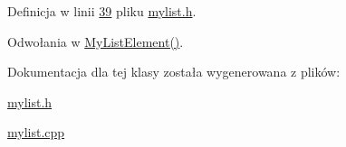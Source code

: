 Definicja w linii \hyperlink{mylist_8h_source_l00039}{39} pliku \hyperlink{mylist_8h_source}{mylist.\-h}.



Odwołania w \hyperlink{mylist_8cpp_source_l00057}{My\-List\-Element()}.



Dokumentacja dla tej klasy została wygenerowana z plików\-:\begin{DoxyCompactItemize}
\item 
\hyperlink{mylist_8h}{mylist.\-h}\item 
\hyperlink{mylist_8cpp}{mylist.\-cpp}\end{DoxyCompactItemize}
